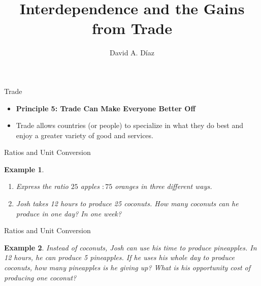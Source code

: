 \documentclass[xcolor={dvipsnames},pdf, hyperref={colorlinks=true, citecolor=ForestGreen, linkcolor=BlueViolet, urlcolor=Magenta}]{beamer}
\title{Interdependence and the Gains from Trade}
\author{David A. D\'iaz}
\institute{UNC Chapel Hill}
\date{}
\newtheorem{exmp}{Example}[section]
\theoremstyle{definition}
\newcommand{\ddp}[1]{{\textcolor{ForestGreen}{#1}}}
\begin{document}
 
	
	\begin{frame}
		
		\titlepage
		
	\end{frame}
	
\begin{frame}{Trade}
	\begin{itemize}
		\item \textbf{Principle 5: Trade Can Make Everyone Better Off}
		\item Trade allows countries (or people) to specialize in what they do best and enjoy a greater variety of good and services.
	\end{itemize}
\end{frame}

\begin{frame}{Ratios and Unit Conversion}
	\begin{exmp}
	\begin{enumerate}
		\item 	Express the ratio $25$ apples $: 75$ oranges in three different ways. 
		\item Josh takes 12 hours to produce 25 coconuts. How many coconuts can he produce in one day? In one week? \\
	\end{enumerate}
	\end{exmp}
	\pause \ddp{(1) $1a : 3o$, $1/3a : 1o$, $50a : 150o$, etc. \\
	(2) 25 coconuts/12 hours $\times$ 24 hours/day = 50 coconuts/day. 50 coconuts/day $\times$ 7 days/week = 350/week.}
\end{frame}

\begin{frame}{Ratios and Unit Conversion}
	\begin{exmp} 
	Instead of coconuts, Josh can use his time to produce pineapples. In 12 hours, he can produce 5 pineapples. If he uses his whole day to produce coconuts, how many pineapples is he giving up? What is his opportunity cost of producing one coconut?
\end{exmp}
\pause \ddp{5 pineapples/12 hours $\times$ 24 hours/day = 10 pineapples/day. \\
	He gives up 10 pineapples to produce 50 coconuts. 
	\\ Ratio: 10 pineapples : 50 coconuts $\Rightarrow$ 1 coconut : 1/5 pineapple. OC of 1 coconut is 1/5 a pineapple.}
\end{frame}
\end{document}

